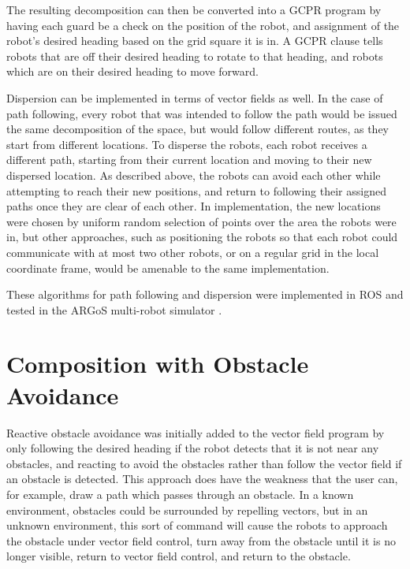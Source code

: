 The resulting decomposition can then be converted into a GCPR program by having each guard be a check on the position of the robot, and assignment of the robot's desired heading based on the grid square it is in.
A GCPR clause tells robots that are off their desired heading to rotate to that heading, and robots which are on their desired heading to move forward. 

Dispersion can be implemented in terms of vector fields as well. 
In the case of path following, every robot that was intended to follow the path would be issued the same decomposition of the space, but would follow different routes, as they start from different locations. 
To disperse the robots, each robot receives a different path, starting from their current location and moving to their new dispersed location. 
As described above, the robots can avoid each other while attempting to reach their new positions, and return to following their assigned paths once they are clear of each other. 
In implementation, the new locations were chosen by uniform random selection of points over the area the robots were in, but other approaches, such as positioning the robots so that each robot could communicate with at most two other robots, or on a regular grid in the local coordinate frame, would be amenable to the same implementation. 

These algorithms for path following and dispersion were implemented in ROS and tested in the ARGoS multi-robot simulator \citep{pinciroli2012argos}.

\section{Composition with Obstacle Avoidance} \label{section:Composition_with_Obstacle_Avoidance}

Reactive obstacle avoidance was initially added to the vector field program by only following the desired heading if the robot detects that it is not near any obstacles, and reacting to avoid the obstacles rather than follow the vector field if an obstacle is detected. 
This approach does have the weakness that the user can, for example, draw a path which passes through an obstacle. 
In a known environment, obstacles could be surrounded by repelling vectors, but in an unknown environment, this sort of command will cause the robots to approach the obstacle under vector field control, turn away from the obstacle until it is no longer visible, return to vector field control, and return to the obstacle. 


